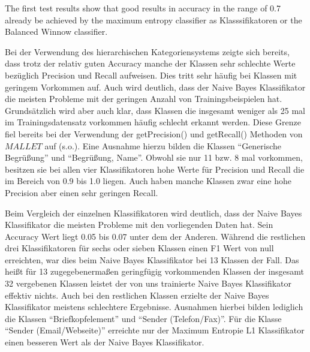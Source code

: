 The first test results show that good results in accuracy in the range of 0.7 already be achieved by the maximum entropy classifier as Klasssifikatoren or the Balanced Winnow classifier.







\vspace*{2cm}

Bei der Verwendung des hierarchischen Kategoriensystems zeigte sich bereits, dass trotz der relativ guten Accuracy manche der Klassen sehr schlechte Werte bezüglich Precision und Recall aufweisen. Dies tritt sehr häufig bei Klassen mit geringem Vorkommen auf. Auch wird deutlich, dass der Naive Bayes Klassifikator die meisten Probleme mit der geringen Anzahl von Trainingsbeispielen hat. Grundsätzlich wird aber auch klar, dass Klassen die insgesamt weniger als 25 mal im Trainingsdatensatz vorkommen häufig schlecht erkannt werden. Diese Grenze fiel bereits bei der Verwendung der getPrecision() und getRecall() Methoden von $MALLET$ auf (s.o.). Eine Ausnahme hierzu bilden die Klassen "`Generische Begrüßung"' und "`Begrüßung, Name"'. Obwohl sie nur 11 bzw. 8 mal vorkommen, besitzen sie bei allen vier Klassifikatoren hohe Werte für Precision und Recall die im Bereich von 0.9 bis 1.0 liegen. Auch haben manche Klassen zwar eine hohe Precision aber einen sehr geringen Recall. 


Beim Vergleich der einzelnen Klassifikatoren wird deutlich, dass der Naive Bayes Klassifikator die meisten Probleme mit den vorliegenden Daten hat. Sein Accuracy Wert liegt 0.05 bis 0.07 unter dem der Anderen. Während die restlichen drei Klassifikatoren für sechs oder sieben Klassen einen F1 Wert von null erreichten, war dies beim Naive Bayes Klassifikator bei 13 Klassen der Fall. Das heißt für 13 zugegebenermaßen geringfügig vorkommenden Klassen der insgesamt 32 vergebenen Klassen leistet der von uns trainierte Naive Bayes Klassifikator effektiv nichts. Auch bei den restlichen Klassen erzielte der Naive Bayes Klassifikator meistens schlechtere Ergebnisse. Ausnahmen hierbei bilden lediglich die Klassen "`Briefkopfelement"' und "`Sender (Telefon/Fax)"'. Für die Klasse "`Sender (Email/Webseite)"' erreichte nur der Maximum Entropie L1 Klassifikator einen besseren Wert als der Naive Bayes Klassifikator. 

